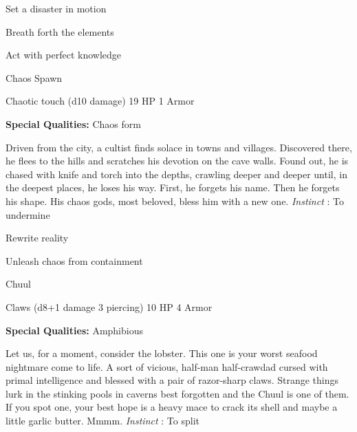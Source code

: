 \startitemize[1,packed]

\item Set a disaster in motion

 
\item Breath forth the elements

 
\item Act with perfect knowledge


\stopitemize
 
\startMonsterName
Chaos Spawn	 
\stopMonsterName
 

Chaotic touch (d10 damage)	19 HP	1 Armor

 


 
\startMonsterQualities
{\bf Special Qualities:}  Chaos form
\stopMonsterQualities
 
\startMonsterDescription
Driven from the city, a cultist finds solace in towns and villages. Discovered there, he flees to the hills and scratches his devotion on the cave walls. Found out, he is chased with knife and torch into the depths, crawling deeper and deeper until, in the deepest places, he loses his way. First, he forgets his name. Then he forgets his shape. His chaos gods, most beloved, bless him with a new one. {\em Instinct} : To undermine
\stopMonsterDescription
 
\startitemize[1,packed]

\item Rewrite reality

 
\item Unleash chaos from containment


\stopitemize
 
\startMonsterName
Chuul	 
\stopMonsterName
 

Claws (d8+1 damage 3 piercing)	10 HP	4 Armor

 


 
\startMonsterQualities
{\bf Special Qualities:}  Amphibious
\stopMonsterQualities
 
\startMonsterDescription
Let us, for a moment, consider the lobster. This one is your worst seafood nightmare come to life. A sort of vicious, half-man half-crawdad cursed with primal intelligence and blessed with a pair of razor-sharp claws. Strange things lurk in the stinking pools in caverns best forgotten and the Chuul is one of them. If you spot one, your best hope is a heavy mace to crack its shell and maybe a little garlic butter. Mmmm. {\em Instinct} : To split
\stopMonsterDescription
 
